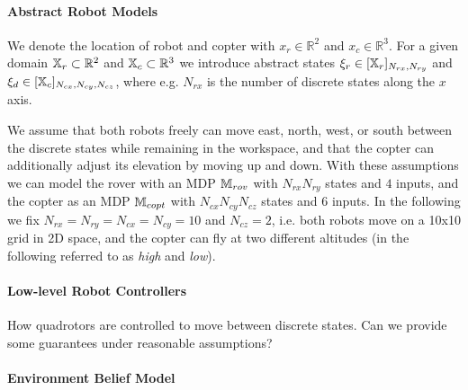 \documentclass[conference]{IEEEtran}
\newcommand{\red}[1]{{\color{red} #1 }}
\begin{document}
\paragraph{Abstract Robot Models}

We denote the location of robot and copter with $x_r \in \mathbb{R}^2$ and $x_c \in \mathbb{R}^3$. For a given domain $\mathbb{X}_r \subset \mathbb{R}^2$ and $\mathbb{X}_c \subset \mathbb{R}^3$ we introduce abstract states $\xi_r \in [\mathbb{X}_r]_{N_{rx}, N_{ry}}$ and $\xi_d \in [\mathbb{X}_c]_{N_{cx}, N_{cy}, N_{cz}}$, where e.g. $N_{rx}$ is the number of discrete states along the $x$ axis. 

We assume that both robots freely can move east, north, west, or south between the discrete states while remaining in the workspace, and that the copter can additionally adjust its elevation by moving up and down. With these assumptions we can model the rover with an MDP $\mathbb{M}_{rov}$ with $N_{rx} N_{ry}$ states and $4$ inputs, and the copter as an MDP $\mathbb{M}_{copt}$ with $N_{cx} N_{cy} N_{cz}$ states and $6$ inputs. In the following we fix $N_{rx} = N_{ry} = N_{cx} = N_{cy} = 10$ and $N_{cz} = 2$, i.e. both robots move on a 10x10 grid in 2D space, and the copter can fly at two different altitudes (in the following referred to as \emph{high} and \emph{low}).

\paragraph{Low-level Robot Controllers}

How quadrotors are controlled to move between discrete states. \red{Can we provide some guarantees under reasonable assumptions?}

\paragraph{Environment Belief Model}
\end{document}
